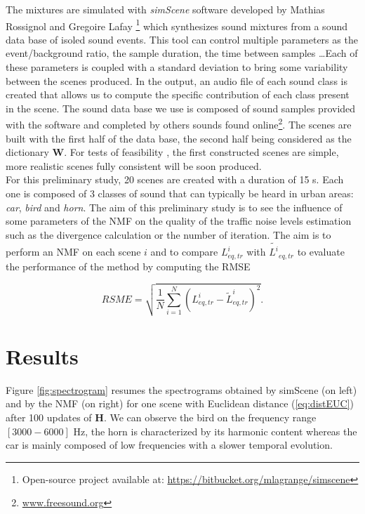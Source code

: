 \documentclass{article}
\begin{document}
\begin{sloppy}
The mixtures are simulated with \textit{simScene} software developed by Mathias Rossignol and Gregoire Lafay \cite{simScene}\footnote{Open-source project available at: \url{https://bitbucket.org/mlagrange/simscene}} which synthesizes sound mixtures from a sound data base of isoled sound events. This tool can control multiple parameters as the event/background ratio, the sample duration, the time between samples \dots Each of these parameters is coupled with a standard deviation to bring some variability between the scenes produced. In the output, an audio file of each sound class is created that allows us to compute the specific contribution of each class present in the scene. The sound data base we use is composed of sound samples provided with the software and completed by others sounds found online\footnote{\url{www.freesound.org}}. The scenes are built with the first half of the data base, the second half being considered as the dictionary $\mathbf{W}$. For tests of feasibility , the first constructed scenes are simple, more realistic scenes fully consistent will be soon produced.\\

For this preliminary study, 20 scenes are created with a duration of 15 s. Each one is composed of 3 classes of sound that can typically be heard in urban areas: \textit{car}, \textit{bird} and \textit{horn}. The aim of this preliminary study is to see the influence of some parameters of the NMF on the quality of the traffic noise levels estimation such as the divergence calculation or the number of iteration. The aim is to perform an NMF on each scene $i$ and to compare $L^i_{eq,tr}$ with $\tilde{L^i}_{eq,tr}$ to evaluate the performance of the method by computing the RMSE

\begin{equation}
RSME = \sqrt{\frac{1}{N}\sum_{i = 1}^N(L^i_{eq,tr}-\tilde{L}^i_{eq,tr})^2}.
\end{equation}

\section{Results}\label{sec:results}

Figure \ref{fig:spectrogram} resumes the spectrograms obtained by simScene (on left) and by the NMF (on right) for one scene with Euclidean distance (\ref{eq:distEUC}) after 100 updates of $\mathbf{H}$. We can observe the bird on the frequency range $\left[3000-6000\right]$ Hz, the horn is characterized by its harmonic content whereas the car is mainly composed of low frequencies with a slower temporal evolution.



\end{sloppy}
\end{document}
